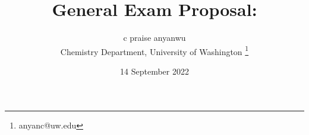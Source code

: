 \documentclass[12pt]{article}
\begin{document}
\title{General Exam Proposal:}
\author{c praise anyanwu \\
    Chemistry Department, University of Washington
    \thanks{anyanc@uw.edu} }
\date{14 September 2022}
\maketitle
\end{document}
